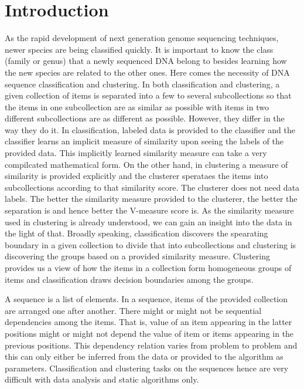 \documentclass[oneside, twocolumn, a4paper, 10pt]{IEEEtran}
\begin{document}
\section{Introduction}
As the rapid development of next generation genome sequencing techniques, newer species are being classified quickly. It is important to know the class (family or genus) that a newly sequenced DNA belong to besides learning how the new species are related to the other ones. Here comes the necessity of DNA sequence classification and clustering. In both classification and clustering, a given collection of items is separated into a few to several subcollections so that the items in one subcollection are as similar as possible with items in two different subcollections are as different as possible. However, they differ in the way they do it. In classification, labeled data is provided to the classifier and the classifier learns an implicit measure of similarity upon seeing the labels of the provided data. This implicitly learned similarity measure can take a very compilcated mathematical form. On the other hand, in clustering a measure of similarity is provided explicitly and the clusterer sperataes the items into subcollections according to that similarity score. The clusterer does not need data labels. The better the similarity measure provided to the clusterer, the better the separation is and hence better the V-measure score is. As the similarity measure used in clustering is already understood, we can gain an insight into the data in the light of that. Broadly speaking, classification discovers the spearating boundary in a given collection to divide that into subcollections and clustering is discovering the groups based on a provided similarity measure. Clustering provides us a view of how the items in a collection form homogeneous groups of items and classification draws decision boundaries among the groups.\\
\par 
A sequence is a list of elements. In a sequence, items of the provided collection are arranged one after another. There might or might not be sequential dependencies among the items. That is, value of an item appearing in the latter positions might or might not depend the value of item or items appearing in the previous positions. This dependency relation varies from problem to problem and this can only either be inferred from the data or provided to the algorithm as parameters. Classification and clustering tasks on the sequences hence are very difficult with data analysis and static algorithms only.\\
\end{document}

